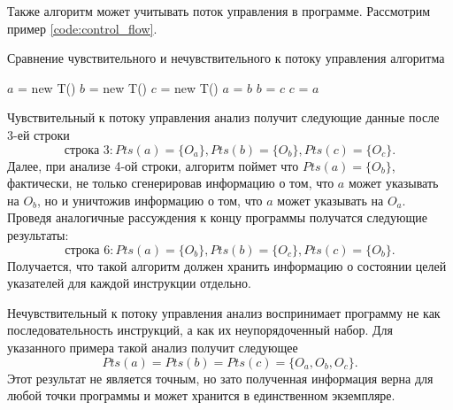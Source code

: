 \documentclass[14pt,titlepage]{extarticle}
\newenvironment{fresh}{\color{Blue}}{\color{black}}
\begin{document}
    \begin{fresh}

    Также алгоритм может учитывать поток управления в программе. Рассмотрим
    пример \ref{code:control_flow}.
    \begin{algorithm}
      \caption{Сравнение чувствительного и нечувствительного к потоку
               управления алгоритма}
      \label{code:control_flow}
      \begin{algorithmic}[1]
        \STATE $a$ = new T()
        \STATE $b$ = new T()
        \STATE $c$ = new T()
        \STATE $a$ = $b$
        \STATE $b$ = $c$
        \STATE $c$ = $a$
      \end{algorithmic}
    \end{algorithm}
    Чувствительный к потоку управления анализ получит следующие данные после
    3-ей строки
    \[\textrm{строка 3}:
        Pts(a) = \{O_a\}, Pts(b) = \{O_b\}, Pts(c) = \{O_c\}.\]
    Далее, при анализе 4-ой строки, алгоритм поймет что $Pts(a) = \{O_b\}$,
    фактически, не только сгенерировав информацию о том, что $a$ может
    указывать на $O_b$, но и уничтожив информацию о том, что $a$ может
    указывать на $O_a$.
    Проведя аналогичные рассуждения к концу программы получатся следующие
    результаты:
    \[\textrm{строка 6}:
        Pts(a) = \{O_b\}, Pts(b) = \{O_c\}, Pts(c) = \{O_b\}.\]
    Получается, что такой алгоритм должен хранить информацию о состоянии целей
    указателей для каждой инструкции отдельно.

    Нечувствительный к потоку управления анализ воспринимает программу не как
    последовательность инструкций, а как их неупорядоченный набор.
    Для указанного примера такой анализ получит следующее
    \[Pts(a) = Pts(b) = Pts(c) = \{O_a, O_b, O_c\}.\]
    Этот результат не является точным, но зато полученная информация верна для
    любой точки программы и может хранится в единственном экземпляре.

    \end{fresh}
\end{document}
